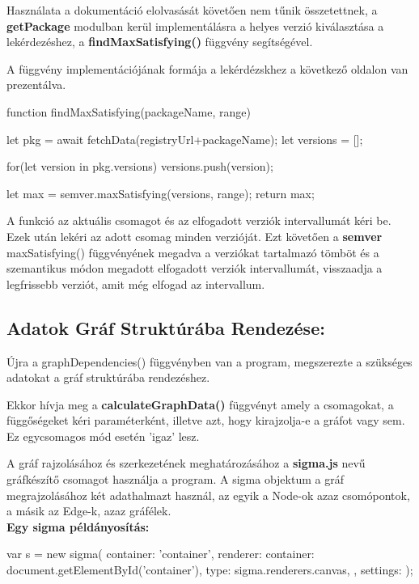 Használata a dokumentáció elolvasását követően nem tűnik összetettnek, a \textbf{getPackage} modulban kerül implementálásra a helyes verzió kiválasztása a lekérdezéshez, a \textbf{findMaxSatisfying()} függvény segítségével.

A függvény implementációjának formája a lekérdézskhez a következő oldalon van prezentálva.

\pagebreak

\begin{js}
function findMaxSatisfying(packageName, range){
	let pkg = await fetchData(registryUrl+packageName);
	let versions = [];
	
	for(let version in pkg.versions){
		versions.push(version);
	}
	
	let max = semver.maxSatisfying(versions, range);
	return max;
}
\end{js}

A funkció az aktuális csomagot és az elfogadott verziók intervallumát kéri be. Ezek után lekéri az adott csomag minden verzióját. Ezt követően a \textbf{semver} maxSatisfying() függvényének megadva a verziókat tartalmazó tömböt és a szemantikus módon megadott elfogadott verziók intervallumát, visszaadja a legfrissebb verziót, amit még elfogad az intervallum.\\

\subsection{Adatok Gráf Struktúrába Rendezése:}

Újra a graphDependencies() függvényben van a program, megszerezte a szükséges adatokat a gráf struktúrába rendezéshez.

Ekkor hívja meg a \textbf{calculateGraphData()} függvényt amely a csomagokat, a függőségeket kéri paraméterként, illetve azt, hogy kirajzolja-e a gráfot vagy sem. Ez egycsomagos mód esetén 'igaz' lesz.

A gráf rajzolásához és szerkezetének meghatározásához a \textbf{sigma.js} nevű gráfkészítő csomagot használja a program. A sigma objektum a gráf megrajzolásához két adathalmazt használ, az egyik a Node-ok azaz csomópontok, a másik az Edge-k, azaz gráfélek.\\

\textbf{Egy sigma példányosítás:
}
\begin{js}
var s = new sigma({ 
	container: 'container',
	renderer: {
		container: document.getElementById('container'),
		type: sigma.renderers.canvas,
	},
	settings: {
	}
}); 
\end{js}

